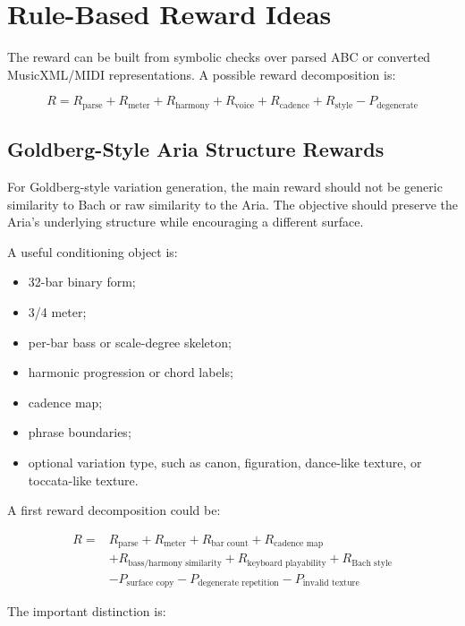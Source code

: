 \documentclass[11pt]{article}
\begin{document}
\section{Rule-Based Reward Ideas}
\label{sec:rewards}

The reward can be built from symbolic checks over parsed ABC or converted
MusicXML/MIDI representations. A possible reward decomposition is:

\[
R = R_{\text{parse}} + R_{\text{meter}} + R_{\text{harmony}}
  + R_{\text{voice}} + R_{\text{cadence}} + R_{\text{style}}
  - P_{\text{degenerate}}
\]

\subsection{Goldberg-Style Aria Structure Rewards}
\label{sec:goldberg-rewards}

For Goldberg-style variation generation, the main reward should not be generic
similarity to Bach or raw similarity to the Aria. The objective should preserve
the Aria's underlying structure while encouraging a different surface.

A useful conditioning object is:

\begin{itemize}[leftmargin=*]
  \item 32-bar binary form;
  \item 3/4 meter;
  \item per-bar bass or scale-degree skeleton;
  \item harmonic progression or chord labels;
  \item cadence map;
  \item phrase boundaries;
  \item optional variation type, such as canon, figuration, dance-like texture,
  or toccata-like texture.
\end{itemize}

A first reward decomposition could be:

\[
\begin{aligned}
R ={}& R_{\text{parse}}
+ R_{\text{meter}}
+ R_{\text{bar count}}
+ R_{\text{cadence map}} \\
&+ R_{\text{bass/harmony similarity}}
+ R_{\text{keyboard playability}}
+ R_{\text{Bach style}} \\
&- P_{\text{surface copy}}
- P_{\text{degenerate repetition}}
- P_{\text{invalid texture}}
\end{aligned}
\]

The important distinction is:
\end{document}
